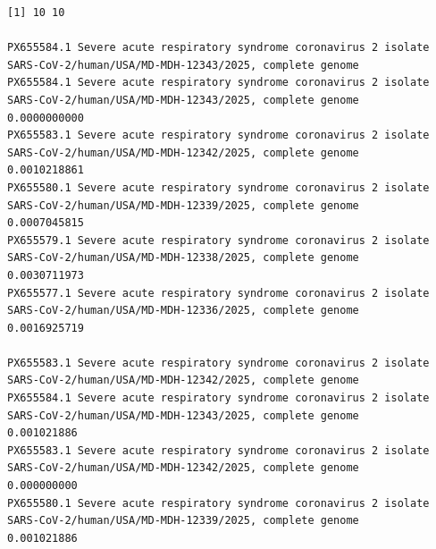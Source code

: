\documentclass[
  11pt,
]{article}
\newenvironment{rpoutput}{\vspace{0.5em}\begin{snugshade}}{\end{snugshade}}
\begin{document}
\begin{rpoutput}

\begin{verbatim}
[1] 10 10
                                                                                                                           PX655584.1 Severe acute respiratory syndrome coronavirus 2 isolate SARS-CoV-2/human/USA/MD-MDH-12343/2025, complete genome
PX655584.1 Severe acute respiratory syndrome coronavirus 2 isolate SARS-CoV-2/human/USA/MD-MDH-12343/2025, complete genome                                                                                                               0.0000000000
PX655583.1 Severe acute respiratory syndrome coronavirus 2 isolate SARS-CoV-2/human/USA/MD-MDH-12342/2025, complete genome                                                                                                               0.0010218861
PX655580.1 Severe acute respiratory syndrome coronavirus 2 isolate SARS-CoV-2/human/USA/MD-MDH-12339/2025, complete genome                                                                                                               0.0007045815
PX655579.1 Severe acute respiratory syndrome coronavirus 2 isolate SARS-CoV-2/human/USA/MD-MDH-12338/2025, complete genome                                                                                                               0.0030711973
PX655577.1 Severe acute respiratory syndrome coronavirus 2 isolate SARS-CoV-2/human/USA/MD-MDH-12336/2025, complete genome                                                                                                               0.0016925719
                                                                                                                           PX655583.1 Severe acute respiratory syndrome coronavirus 2 isolate SARS-CoV-2/human/USA/MD-MDH-12342/2025, complete genome
PX655584.1 Severe acute respiratory syndrome coronavirus 2 isolate SARS-CoV-2/human/USA/MD-MDH-12343/2025, complete genome                                                                                                                0.001021886
PX655583.1 Severe acute respiratory syndrome coronavirus 2 isolate SARS-CoV-2/human/USA/MD-MDH-12342/2025, complete genome                                                                                                                0.000000000
PX655580.1 Severe acute respiratory syndrome coronavirus 2 isolate SARS-CoV-2/human/USA/MD-MDH-12339/2025, complete genome                                                                                                                0.001021886

\end{verbatim}
\end{rpoutput}
\end{document}
